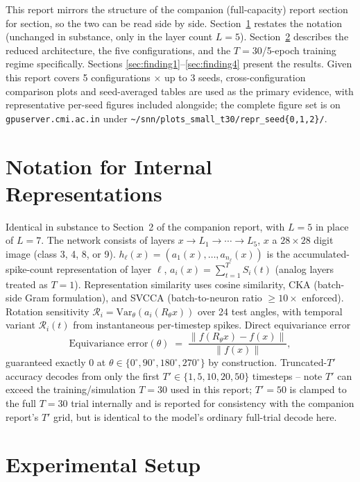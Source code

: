 \documentclass[11pt]{article}
\begin{document}
This report mirrors the structure of the companion (full-capacity) report section for section, so the
two can be read side by side. Section~\ref{sec:notation} restates the notation (unchanged in
substance, only in the layer count $L=5$). Section~\ref{sec:setup} describes the reduced architecture,
the five configurations, and the $T=30$/5-epoch training regime specifically. Sections
\ref{sec:finding1}--\ref{sec:finding4} present the results. Given this report covers 5 configurations
$\times$ up to 3 seeds, cross-configuration comparison plots and seed-averaged tables are used as the
primary evidence, with representative per-seed figures included alongside; the complete figure set is
on \texttt{gpuserver.cmi.ac.in} under \texttt{\textasciitilde/snn/plots\_small\_t30/repr\_seed\{0,1,2\}/}.

\section{Notation for Internal Representations}
\label{sec:notation}

Identical in substance to Section~2 of the companion report, with $L=5$ in place of $L=7$. The
network consists of layers $x \to L_1 \to \cdots \to L_5$, $x$ a $28\times28$ digit image (class 3,
4, 8, or 9). $h_\ell(x) = (a_1(x),\ldots,a_{n_\ell}(x))$ is the accumulated-spike-count representation
of layer $\ell$, $a_i(x) = \sum_{t=1}^{T} S_i(t)$ (analog layers treated as $T=1$). Representation
similarity uses cosine similarity, CKA (batch-side Gram formulation), and SVCCA (batch-to-neuron
ratio $\geq 10\times$ enforced). Rotation sensitivity $\mathcal{R}_i = \mathrm{Var}_\theta(a_i(R_\theta x))$
over 24 test angles, with temporal variant $\mathcal{R}_i(t)$ from instantaneous per-timestep spikes.
Direct equivariance error
\[
\text{Equivariance error}(\theta) \;=\; \frac{\|f(R_\theta x) - f(x)\|}{\|f(x)\|},
\]
guaranteed exactly 0 at $\theta \in \{0^\circ,90^\circ,180^\circ,270^\circ\}$ by construction.
Truncated-$T'$ accuracy decodes from only the first $T' \in \{1,5,10,20,50\}$ timesteps -- note $T'$
can exceed the training/simulation $T=30$ used in this report; $T'=50$ is clamped to the full $T=30$
trial internally and is reported for consistency with the companion report's $T'$ grid, but is
identical to the model's ordinary full-trial decode here.

\section{Experimental Setup}
\label{sec:setup}
\end{document}
